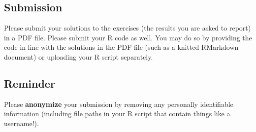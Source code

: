 \documentclass{article}
\begin{document}
    \subsection*{\sc Submission}

      Please submit your solutions to the exercises (the results you are asked to report) in a PDF file. Please submit your R code as well. You may do so by providing the code in line with the solutions in the PDF file (such as a knitted RMarkdown document) or uploading your R script separately.

    \subsection*{\sc Reminder}

      Please {\bf anonymize} your submission by removing any personally identifiable information (including file paths in your R script that contain things like a username!).
\end{document}
